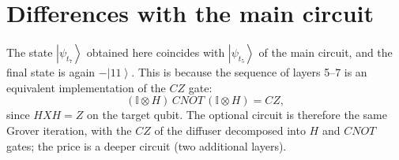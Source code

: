 \documentclass[11pt,a4paper]{article}
\newcommand{\ket}[1]{\left|#1\right\rangle}
\newcommand{\psit}[1]{\ket{\psi_{t_{#1}}}}
\begin{document}
\section*{Differences with the main circuit}
The state $\psit{7}$ obtained here coincides with $\psit{5}$ of the main circuit, and the final
state is again $-\ket{11}$. This is because the sequence of layers 5--7 is an equivalent
implementation of the $CZ$ gate:
\[
(\mathbb{I}\otimes H)\,CNOT\,(\mathbb{I}\otimes H) = CZ,
\]
since $HXH = Z$ on the target qubit. The optional circuit is therefore the same Grover iteration,
with the $CZ$ of the diffuser decomposed into $H$ and $CNOT$ gates; the price is a deeper circuit
(two additional layers).
\end{document}
